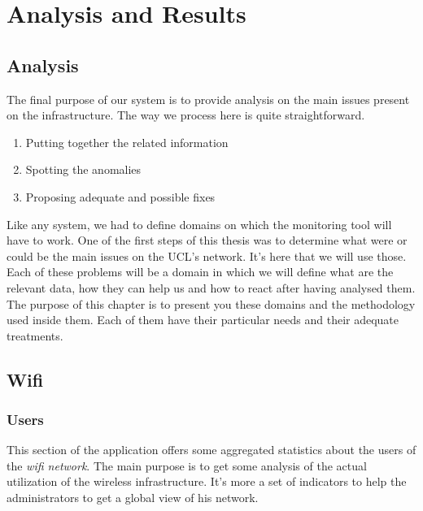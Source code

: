 
\chapter{Analysis and Results} %

\label{Chapter6} %


\section{Analysis}
The final purpose of our system is to provide analysis on the main issues present on the infrastructure. The way we process here is quite straightforward.

\begin{enumerate}
\item Putting together the related information
\item Spotting the anomalies
\item Proposing adequate and possible fixes
\end{enumerate}
Like any system, we had to define domains on which the monitoring tool will have to work. One of the first steps of this thesis was to determine what were or could be the main issues on the UCL's network. It's here that we will use those. Each of these problems will be a domain in which we will define what are the relevant data, how they can help us and how to react after having analysed them. The purpose of this chapter is to present you these domains and the methodology used inside them. Each of them have their particular needs and their adequate treatments.

\section{Wifi}
\subsection{Users}
This section of the application offers some aggregated statistics about the users of the \emph{wifi network}. The main purpose is to get some analysis of the actual utilization of the wireless infrastructure. It's more a set of indicators to help the administrators to get a global view of his network. 
